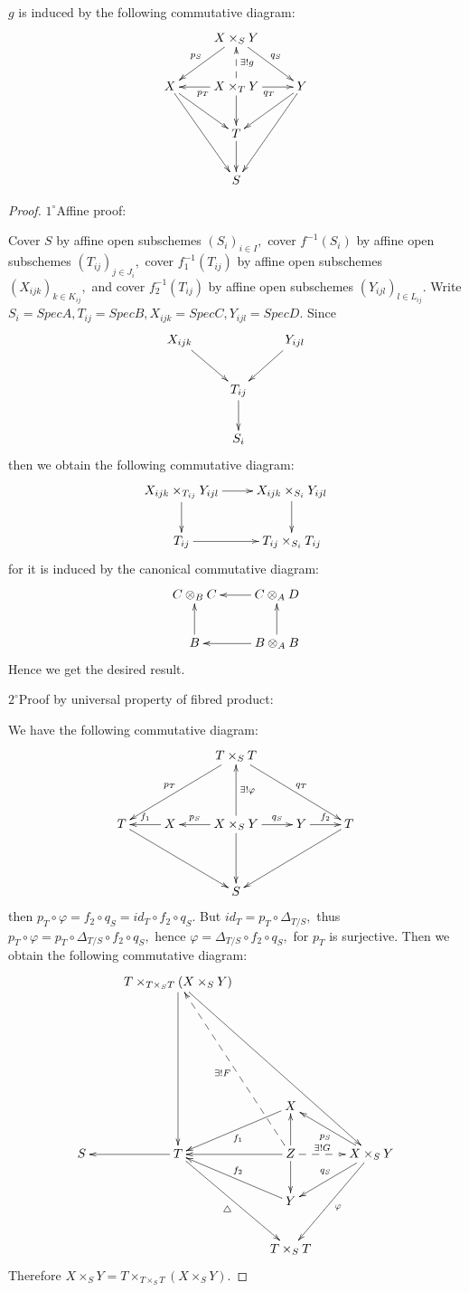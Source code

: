 \begin{remark}
$g$ is induced by the following commutative diagram:
\[ \xymatrix{
   & {X\times_S Y} \ar"2,1"_{p_S} \ar"2,3"^{q_S}          \\
   X \ar"3,2" \ar"4,2" & {X\times_T Y} \ar[l]^{p_T} \ar[r]_{q_T}
   \ar[d] \ar@{-->}[u]_{\exists ! g} & Y \ar"3,2" \ar"4,2" \\
   & T \ar[d]                                             \\
   & S} \]
\end{remark}
\begin{proof}
$\mathit{1^{\circ}}$Affine proof:

Cover $S$ by affine open subschemes $(S_i)_{i\in I},$ cover
$f^{-1}(S_i)$ by affine open subschemes $(T_{ij})_{j\in J_i},$ cover
$f_1^{-1}(T_{ij})$ by affine open subschemes $(X_{ijk})_{k\in
K_{ij}},$ and cover $f_2^{-1}(T_{ij})$ by affine open subschemes
$(Y_{ijl})_{l\in L_{ij}}.$ Write $S_i=SpecA, T_{ij}=SpecB,
X_{ijk}=SpecC, Y_{ijl}=SpecD.$ Since
\[ \xymatrix{
    X_{ijk} \ar"2,2" & & Y_{ijl} \ar"2,2"  \\
    & T_{ij} \ar[d]  \\
    & S_i } \]
then we obtain the following commutative diagram:
\[ \xymatrix{
   {X_{ijk}\times_{T_{ij}} Y_{ijl}} \ar[d] \ar[r] &
   {X_{ijk}\times_{S_i} Y_{ijl}} \ar[d]            \\
   T_{ij} \ar[r] & {T_{ij}\times_{S_i} T_{ij}} }  \]
for it is induced by the canonical commutative diagram:
\[ \xymatrix{
   {C\otimes_B C} & {C\otimes_A D} \ar[l]   \\
   B \ar[u]  & {B\otimes_A B} \ar[u] \ar[l] }  \]
Hence we get the desired result.

$\mathit{2^{\circ}}$Proof by universal property of fibred product:

We have the following commutative diagram:
\[ \xymatrix@R=4em{
   & & {T\times_S T} \ar"2,1"_-{p_T} \ar"2,5"^-{q_T}    \\
   T \ar"3,3" & X \ar[l]_-{f_1} & {X\times_S Y} \ar[l]_-{p_S}
   \ar[r]^-{q_S} \ar[d] \ar[u]_-{\exists !\varphi} & Y \ar[r]^-{f_2} &
   T \ar"3,3"                                         \\
   & & S} \]
then $p_T\circ\varphi=f_2\circ q_S=id_T\circ f_2 \circ q_S.$ But
$id_T=p_T\circ \Delta_{T/S},$ thus $p_T\circ \varphi=p_T\circ
\Delta_{T/S}\circ f_2\circ q_S,$ hence $\varphi=\Delta_{T/S}\circ
f_2\circ q_S,$ for $p_T$ is surjective. Then we obtain the following
commutative diagram:
\[ \xymatrix{
   &   {T \times_{T \times_S T} (X \times_S Y)} \ar"5,2" \ar"5,4"
   \\\\\\
   & & X \ar"5,2"^{f_1}                                               \\
   S & T \ar"5,1" \ar"7,3"_{\bigtriangleup}
   &Z \ar"5,2" \ar"4,3" \ar"6,3" \ar@{-->}"5,4"^-{\exists !G}
   \ar@{-->}"1,2"^{\exists !F}
   &{X \times_S Y} \ar"4,3"^{p_S} \ar"6,3"_{q_S} \ar"7,3"^{\varphi}     \\
   & & Y \ar"5,2"_{f_2}                                               \\
   & &  {T \times_S T}            }     \]
Therefore $X\times_S Y=T\times_{T\times_S T} (X\times_S Y).$
\end{proof}
